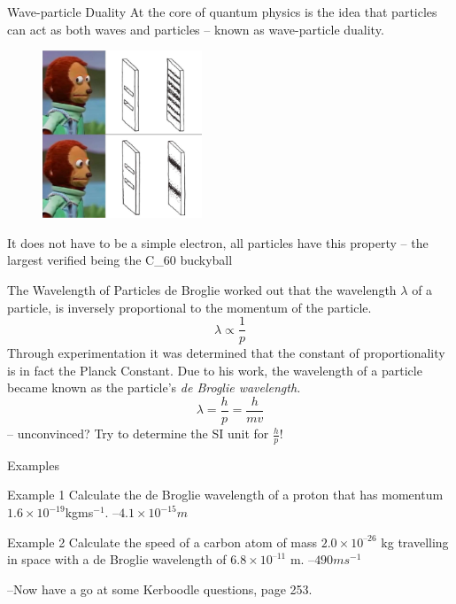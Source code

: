 \documentclass[../Main.tex]{subfiles}
\begin{document}
    \begin{frame}{Wave-particle Duality}
        At the core of quantum physics is the idea that particles can act as both waves and particles -- known as wave-particle duality.
        
        \begin{figure}
            \centering
            \includegraphics[height=5cm]{Quantum_Images/particlesobserved.png}
        \end{figure}
        It does not have to be a simple electron, all particles have this property -- the largest verified being the C_{60} buckyball
    \end{frame}
    
    \begin{frame}{The Wavelength of Particles}
        de Broglie worked out that the wavelength $\lambda$ of a particle, is inversely proportional to the momentum of the particle. 
        \begin{equation*}
            \lambda \propto \frac{1}{p}
        \end{equation*} \pause
        Through experimentation it was determined that the constant of proportionality is in fact the Planck Constant. Due to his work, the wavelength of a particle became known as the particle's \emph{de Broglie wavelength.}
        \begin{equation*}
            \lambda = \frac{h}{p} = \frac{h}{mv}
        \end{equation*} -- unconvinced? Try to determine the SI unit for $\frac{h}{p}$!
    \end{frame}
    
    \begin{frame}{Examples}
        \begin{exampleblock}{Example 1}
            Calculate the de Broglie wavelength of a proton that has momentum $1.6\times 10^{-19}$kgms$^{-1}$. \pause
            --$4.1\times 10^{-15}m$
        \end{exampleblock} \pause
        
        \begin{exampleblock}{Example 2}
            Calculate the speed of a carbon atom of mass $2.0\times10^{–26}$ kg travelling in space with a de Broglie wavelength of $6.8 \times 10^{–11}$ m. \pause
            --$490ms^{-1}$
        \end{exampleblock}
        \pause
        --Now have a go at some Kerboodle questions, page 253.
    \end{frame}
    
\end{document}
